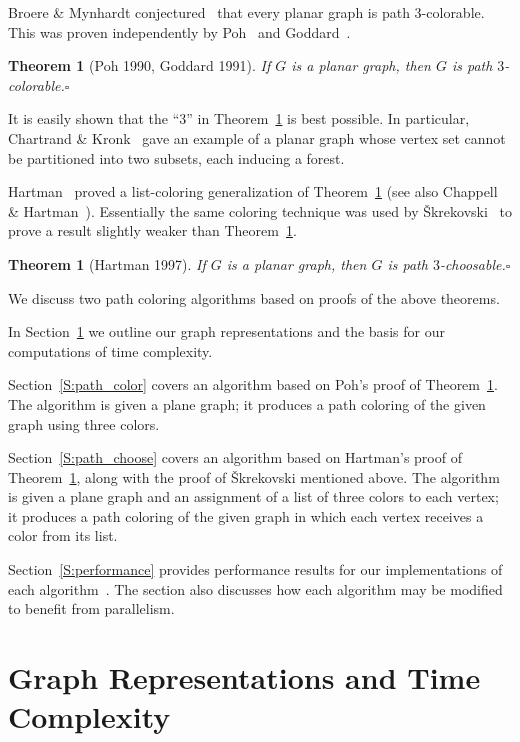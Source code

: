 \documentclass[12pt,letterpaper]{article}
\theoremstyle{plain}
\newtheorem{theorem}[lemma]{Theorem}         %
\theoremstyle{definition}
\theoremstyle{break}
\newcommand{\ggcqedsymbol}{$\square$}
\newcommand{\ggcqed}{\hbox{}\nobreak\hbox{\quad\ggcqedsymbol}}
\newcommand{\ggcnopf}{\ggcqed}
\begin{document}
Broere \& Mynhardt conjectured~\cite[Conj.~16]{BrMy1985}
that every planar graph is path $3$-colorable.
This was proven independently by Poh~\cite[Thm.~2]{Poh1990}
and Goddard~\cite[Thm.~1]{God1991}.

\begin{theorem}[Poh 1990, Goddard 1991]\label{T:planar3c}
If $G$ is a planar graph,
then $G$ is path $3$-colorable.\ggcnopf\end{theorem}

It is easily shown that the ``$3$'' in Theorem~\ref{T:planar3c}
is best possible.
In particular, Chartrand \& Kronk~\cite[Section~3]{ChKr1969}
gave an example of a planar graph whose vertex set cannot be partitioned
into two subsets, each inducing a forest.

Hartman~\cite[Thm.~4.1]{Har1997}
proved a list-coloring generalization of Theorem~\ref{T:planar3c}
(see also Chappell \& Hartman~\cite[Thm.~2.1]{ChHa2017prep}).
Essentially the same coloring technique was used by
\v{S}krekovski~\cite[Thm.~2.2b]{Skr1999}
to prove a result slightly weaker than Theorem~\ref{T:planar3}.

\begin{theorem}[Hartman 1997]\label{T:planar3}
If $G$ is a planar graph,
then $G$ is path $3$-choosable.\ggcnopf\end{theorem}

We discuss two path coloring algorithms
based on proofs of the above theorems.

In Section~\ref{S:representation} we outline our graph representations
and the basis for our computations of time complexity.

Section~\ref{S:path_color} covers an algorithm
based on Poh's proof of Theorem~\ref{T:planar3c}.
The algorithm is given a plane graph;
it produces a path coloring of the given graph
using three colors.

Section~\ref{S:path_choose} covers an algorithm
based on Hartman's proof of Theorem~\ref{T:planar3},
along with the proof of \v{S}krekovski mentioned above.
The algorithm is given a plane graph
and an assignment of a list of three colors to each vertex;
it produces a path coloring of the given graph
in which each vertex receives a color from its list.

Section~\ref{S:performance} provides performance results for our
implementations of each algorithm~\cite{Bro2017}. The section also
discusses how each algorithm may be modified to benefit from parallelism.


\section{Graph Representations and Time Complexity}\label{S:representation}
\end{document}
